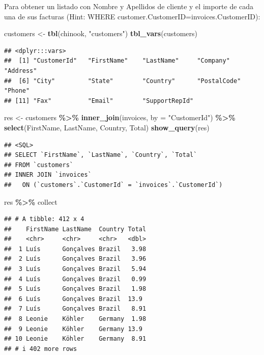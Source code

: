\documentclass[
]{book}
\newenvironment{Shaded}{\begin{snugshade}}{\end{snugshade}}
\newcommand{\AttributeTok}[1]{\textcolor[rgb]{0.13,0.29,0.53}{#1}}
\newcommand{\FunctionTok}[1]{\textcolor[rgb]{0.13,0.29,0.53}{\textbf{#1}}}
\newcommand{\NormalTok}[1]{#1}
\newcommand{\OtherTok}[1]{\textcolor[rgb]{0.56,0.35,0.01}{#1}}
\newcommand{\SpecialCharTok}[1]{\textcolor[rgb]{0.81,0.36,0.00}{\textbf{#1}}}
\newcommand{\StringTok}[1]{\textcolor[rgb]{0.31,0.60,0.02}{#1}}
\theoremstyle{break}
\theoremstyle{nonumberplain}
\begin{document}
Para obtener un listado con Nombre y Apellidos de cliente y el importe de cada una de sus facturas (Hint: WHERE customer.CustomerID=invoices.CustomerID):

\begin{Shaded}
\begin{Highlighting}[]
\NormalTok{customers }\OtherTok{\textless{}{-}} \FunctionTok{tbl}\NormalTok{(chinook, }\StringTok{"customers"}\NormalTok{)}
\FunctionTok{tbl\_vars}\NormalTok{(customers) }
\end{Highlighting}
\end{Shaded}

\begin{verbatim}
## <dplyr:::vars>
##  [1] "CustomerId"   "FirstName"    "LastName"     "Company"      "Address"     
##  [6] "City"         "State"        "Country"      "PostalCode"   "Phone"       
## [11] "Fax"          "Email"        "SupportRepId"
\end{verbatim}

\begin{Shaded}
\begin{Highlighting}[]
\NormalTok{res }\OtherTok{\textless{}{-}}\NormalTok{ customers }\SpecialCharTok{\%\textgreater{}\%} \FunctionTok{inner\_join}\NormalTok{(invoices, }\AttributeTok{by =} \StringTok{"CustomerId"}\NormalTok{) }\SpecialCharTok{\%\textgreater{}\%} \FunctionTok{select}\NormalTok{(FirstName, LastName, Country, Total) }
\FunctionTok{show\_query}\NormalTok{(res)}
\end{Highlighting}
\end{Shaded}

\begin{verbatim}
## <SQL>
## SELECT `FirstName`, `LastName`, `Country`, `Total`
## FROM `customers`
## INNER JOIN `invoices`
##   ON (`customers`.`CustomerId` = `invoices`.`CustomerId`)
\end{verbatim}

\begin{Shaded}
\begin{Highlighting}[]
\NormalTok{res  }\SpecialCharTok{\%\textgreater{}\%}\NormalTok{ collect}
\end{Highlighting}
\end{Shaded}

\begin{verbatim}
## # A tibble: 412 x 4
##    FirstName LastName  Country Total
##    <chr>     <chr>     <chr>   <dbl>
##  1 Luís      Gonçalves Brazil   3.98
##  2 Luís      Gonçalves Brazil   3.96
##  3 Luís      Gonçalves Brazil   5.94
##  4 Luís      Gonçalves Brazil   0.99
##  5 Luís      Gonçalves Brazil   1.98
##  6 Luís      Gonçalves Brazil  13.9 
##  7 Luís      Gonçalves Brazil   8.91
##  8 Leonie    Köhler    Germany  1.98
##  9 Leonie    Köhler    Germany 13.9 
## 10 Leonie    Köhler    Germany  8.91
## # i 402 more rows
\end{verbatim}
\end{document}
